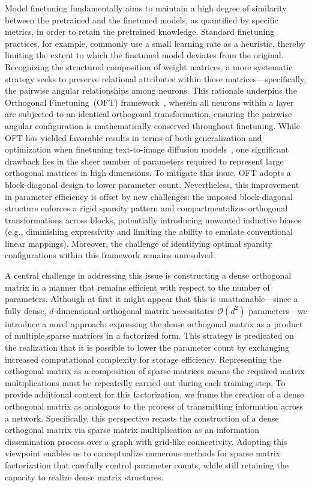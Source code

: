 Model finetuning fundamentally aims to maintain a high degree of similarity between the pretrained and the finetuned models, as quantified by specific metrics, in order to retain the pretrained knowledge. Standard finetuning practices, for example, commonly use a small learning rate as a heuristic, thereby limiting the extent to which the finetuned model deviates from the original. Recognizing the structured composition of weight matrices, a more systematic strategy seeks to preserve relational attributes within these matrices—specifically, the pairwise angular relationships among neurons. This rationale underpins the Orthogonal Finetuning~(OFT) framework~\cite{qiu2023controlling}, wherein all neurons within a layer are subjected to an identical orthogonal transformation, ensuring the pairwise angular configuration is mathematically conserved throughout finetuning. While OFT has yielded favorable results in terms of both generalization and optimization when finetuning text-to-image diffusion models~\cite{qiu2023controlling}, one significant drawback lies in the sheer number of parameters required to represent large orthogonal matrices in high dimensions. To mitigate this issue, OFT adopts a block-diagonal design to lower parameter count. Nevertheless, this improvement in parameter efficiency is offset by new challenges: the imposed block-diagonal structure enforces a rigid sparsity pattern and compartmentalizes orthogonal transformations across blocks, potentially introducing unwanted inductive biases (e.g., diminishing expressivity and limiting the ability to emulate conventional linear mappings). Moreover, the challenge of identifying optimal sparsity configurations within this framework remains unresolved.

A central challenge in addressing this issue is constructing a dense orthogonal matrix in a manner that remains efficient with respect to the number of parameters. Although at first it might appear that this is unattainable—since a fully dense, $d$-dimensional orthogonal matrix necessitates $\mathcal{O}(d^2)$ parameters—we introduce a novel approach: expressing the dense orthogonal matrix as a product of multiple sparse matrices in a factorized form. This strategy is predicated on the realization that it is possible to lower the parameter count by exchanging increased computational complexity for storage efficiency. Representing the orthogonal matrix as a composition of sparse matrices means the required matrix multiplications must be repeatedly carried out during each training step. To provide additional context for this factorization, we frame the creation of a dense orthogonal matrix as analogous to the process of transmitting information across a network. Specifically, this perspective recasts the construction of a dense orthogonal matrix via sparse matrix multiplication as an information dissemination process over a graph with grid-like connectivity. Adopting this viewpoint enables us to conceptualize numerous methods for sparse matrix factorization that carefully control parameter counts, while still retaining the capacity to realize dense matrix structures.

